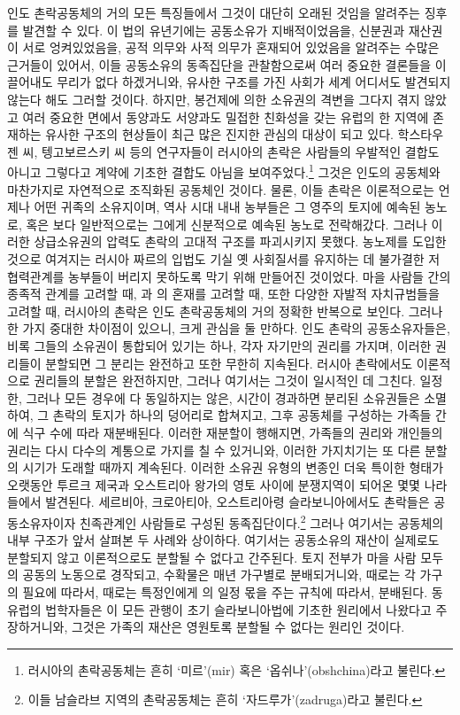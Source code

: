인도 촌락공동체의 거의 모든 특징들에서
그것이 대단히 오래된 것임을 알려주는 징후를 발견할 수 있다.
이 법의 유년기에는 공동소유가 지배적이었음을,
신분권과 재산권이 서로 엉켜있었음을,
공적 의무와 사적 의무가 혼재되어 있었음을 알려주는
수많은 근거들이 있어서,
이들 공동소유의 동족집단을 관찰함으로써 여러 중요한 결론들을
이끌어내도 무리가 없다 하겠거니와,
유사한 구조를 가진 사회가 세계 어디서도 발견되지 않는다 해도 그러할 것이다.
하지만,
봉건제에 의한 소유권의 격변을 그다지 겪지 않았고
여러 중요한 면에서 동양과도 서양과도 밀접한 친화성을 갖는
유럽의 한 지역에 존재하는 유사한 구조의 현상들이
최근 많은 진지한 관심의 대상이 되고 있다.
학스타우젠 씨,
텡고보르스키 씨 등의 연구자들이
러시아의 촌락은 사람들의 우발적인 결합도 아니고
그렇다고 계약에 기초한 결합도 아님을 보여주었다.\footnote{%
  러시아의 촌락공동체는 흔히 `미르'(mir) 혹은 `옵쉬나'(obshchina)라고 불린다. }
그것은 인도의 공동체와 마찬가지로 자연적으로 조직화된 공동체인 것이다.
물론,
이들 촌락은 이론적으로는 언제나 어떤 귀족의 소유지이며,
역사 시대 내내
농부들은
그 영주의 토지에 예속된 농노로,
혹은 보다 일반적으로는
그에게 신분적으로 예속된 농노로 전락해갔다.
그러나
이러한 상급소유권의 압력도
촌락의 고대적 구조를 파괴시키지 못했다.
농노제를 도입한 것으로 여겨지는 러시아 짜르의 입법도
기실 옛 사회질서를 유지하는 데 불가결한 저 협력관계를
농부들이 버리지 못하도록 막기 위해 만들어진 것이었다.
마을 사람들 간의 종족적 관계를 고려할 때,
과 의 혼재를 고려할 때,
또한 다양한 자발적 자치규범들을 고려할 때,
러시아의 촌락은 인도 촌락공동체의 거의 정확한 반복으로 보인다.
그러나 한 가지 중대한 차이점이 있으니,
크게 관심을 둘 만하다.
인도 촌락의 공동소유자들은,
비록 그들의 소유권이 통합되어 있기는 하나,
각자 자기만의 권리를 가지며,
이러한 권리들이 분할되면 그 분리는 완전하고 또한 무한히 지속된다.
러시아 촌락에서도 이론적으로 권리들의 분할은 완전하지만,
그러나 여기서는 그것이 일시적인 데 그친다.
일정한, 그러나 모든 경우에 다 동일하지는 않은,
시간이 경과하면
분리된 소유권들은 소멸하여,
그 촌락의 토지가 하나의 덩어리로 합쳐지고, 그후
공동체를 구성하는 가족들 간에 식구 수에 따라 재분배된다.
이러한 재분할이 행해지면,
가족들의 권리와 개인들의 권리는 다시
다수의 계통으로 가지를 칠 수 있거니와,
이러한 가지치기는 또 다른 분할의 시기가 도래할 때까지 계속된다.
이러한 소유권 유형의 변종인 더욱 특이한 형태가
오랫동안
투르크 제국과 오스트리아 왕가의 영토 사이에 분쟁지역이 되어온
몇몇 나라들에서 발견된다.
세르비아, 크로아티아, 오스트리아령 슬라보니아에서도
촌락들은 공동소유자이자 친족관계인 사람들로 구성된 동족집단이다.\footnote{%
  이들 남슬라브 지역의 촌락공동체는 흔히 `자드루가'(zadruga)라고 불린다. }
그러나 여기서는 공동체의 내부 구조가
앞서 살펴본 두 사례와 상이하다.
여기서는 공동소유의 재산이 실제로도 분할되지 않고
이론적으로도 분할될 수 없다고 간주된다.
토지 전부가 마을 사람 모두의 공동의 노동으로 경작되고,
수확물은 매년 가구별로 분배되거니와,
때로는 각 가구의 필요에 따라서,
때로는 특정인에게 의 일정 몫을 주는 규칙에 따라서,
분배된다.
동유럽의 법학자들은 이 모든 관행이
초기 슬라보니아법에 기초한 원리에서 나왔다고 주장하거니와,
그것은 가족의 재산은 영원토록 분할될 수 없다는 원리인 것이다.

